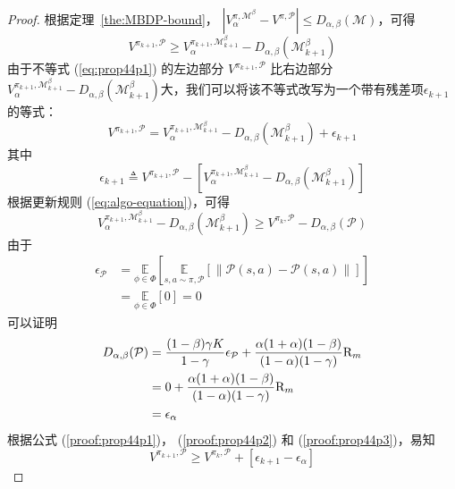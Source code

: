 \begin{proof}

根据定理~\ref{the:MBDP-bound}， $\left|{V}_\alpha^{\pi, \mathcal{M}^\beta}-{V}^{\pi, \mathcal{P}}\right|\leq D_{\alpha,\beta}(\mathcal{M})$，可得
\begin{equation}\label{eq:prop44p1}
{V}^{\pi_{k+1}, \mathcal{P}} \geq {V}_{\alpha}^{\pi_{k+1}, \mathcal{M}_{k+1}^\beta}-D_{\alpha,\beta}(\mathcal{M}_{k+1}^\beta)
\end{equation}
由于不等式 (\ref{eq:prop44p1}) 的左边部分 ${V}^{\pi_{k+1}, \mathcal{P}}$ 比右边部分${V}_{\alpha}^{\pi_{k+1}, \mathcal{M}_{k+1}^\beta}-D_{\alpha,\beta}(\mathcal{M}_{k+1}^\beta)$大，我们可以将该不等式改写为一个带有残差项$\epsilon_{k+1}$的等式：
\begin{equation}\label{proof:prop44p1}
{V}^{\pi_{k+1}, \mathcal{P}} = {V}_{\alpha}^{\pi_{k+1}, \mathcal{M}_{k+1}^\beta}-D_{\alpha,\beta}(\mathcal{M}_{k+1}^\beta) + \epsilon_{k+1}
\end{equation}
其中
\begin{equation}
\epsilon_{k+1} \triangleq {V}^{\pi_{k+1}, \mathcal{P}} - \left[{V}_{\alpha}^{\pi_{k+1}, \mathcal{M}_{k+1}^\beta} - D_{\alpha,\beta}(\mathcal{M}_{k+1}^\beta)\right]
\end{equation}
根据更新规则 (\ref{eq:algo-equation})，可得
\begin{equation}\label{proof:prop44p2}
{V}_{\alpha}^{\pi_{k+1}, \mathcal{M}_{k+1}^\beta}-D_{\alpha,\beta}(\mathcal{M}_{k+1}^\beta) \geq {V}^{\pi_k,\mathcal{P}}-D_{\alpha,\beta}(\mathcal{P})
\end{equation}
由于
\begin{align*}
\epsilon_{\mathcal{P}} &= \underset{\phi\in\Phi}{\mathbb{E}}\left[\underset{s,a\sim \pi,\mathcal{P}}{\mathbb{E}}\left[\left\|\mathcal{P}(s, a)-\mathcal{P}(s, a)\right\|\right]\right]\\
&=\underset{\phi\in\Phi}{\mathbb{E}}\left[0\right] = 0
\end{align*}
可以证明
\begin{align}
D_{\alpha,\beta}(\mathcal{P}) &= \frac{(1-\beta)\gamma K}{1-\gamma}\epsilon_{\mathcal{P}}+\frac{\alpha(1+\alpha)(1-\beta)}{(1-\alpha)(1-\gamma)}\mathrm{R}_m\notag\\
&=0+\frac{\alpha(1+\alpha)(1-\beta)}{(1-\alpha)(1-\gamma)}\mathrm{R}_m\notag\\
&=\epsilon_\alpha \label{proof:prop44p3}
\end{align}
根据公式 (\ref{proof:prop44p1})， (\ref{proof:prop44p2}) 和 (\ref{proof:prop44p3})，易知
\begin{equation}
{V}^{\pi_{k+1}, \mathcal{P}}\geq {V}^{\pi_{k}, \mathcal{P}} + \left[\epsilon_{k+1} - \epsilon_\alpha\right]
\end{equation}


\end{proof}
